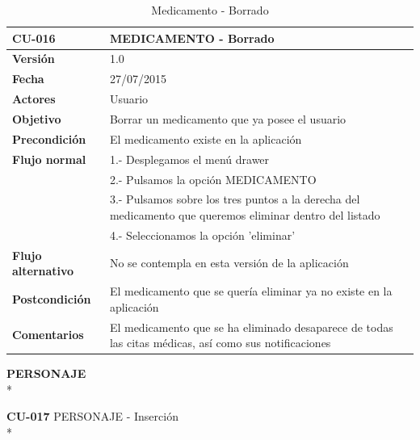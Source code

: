 \documentclass[../pfc.tex]{subfiles}
\begin{document}
		\begin{table}[H]
			\centering
			\begin{tabular}[t]{|p{3cm}|p{9.5cm}|}
				\hline \textbf{CU-016} & \textbf{MEDICAMENTO - Borrado} \\*
				\hline\hline \textbf{Versión} & 1.0 \\*
				\hline\hline \textbf{Fecha} & 27/07/2015 \\*
				\hline\textbf{Actores} 	& Usuario\\*
				\hline \textbf{Objetivo} & Borrar un medicamento que ya posee el usuario\\* 			
				\hline \textbf{Precondición} & El medicamento existe en la aplicación\\* 
				\hline \textbf{Flujo normal} & 1.- Desplegamos el menú drawer \\* 
				& 2.- Pulsamos la opción MEDICAMENTO\\*	
				& 3.- Pulsamos sobre los tres puntos a la derecha del medicamento que queremos eliminar dentro del listado\\*	
				& 4.- Seleccionamos la opción 'eliminar'\\*	
				\hline \textbf{Flujo alternativo} & No se contempla en esta versión de la aplicación\\* 
				\hline \textbf{Postcondición} & El medicamento que se quería eliminar ya no existe en la aplicación \\* 
				\hline \textbf{Comentarios}   & El medicamento que se ha eliminado desaparece de todas las citas médicas, así como sus notificaciones\\*
				\hline
			\end{tabular}
			\caption{Medicamento - Borrado}
			\label{tabla:caso016}
		\end{table}
		
		\clearpage
		
		\textbf{PERSONAJE}\\*
		
		\textbf{CU-017}	PERSONAJE - Inserción\\*
		
\end{document}
